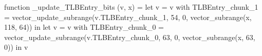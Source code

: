 function _update_TLBEntry_bits (v, x) = let v = { v with TLBEntry_chunk_1 = vector_update_subrange(v.TLBEntry_chunk_1, 54, 0, vector_subrange(x, 118, 64)) } in let v = { v with TLBEntry_chunk_0 = vector_update_subrange(v.TLBEntry_chunk_0, 63, 0, vector_subrange(x, 63, 0)) } in v
